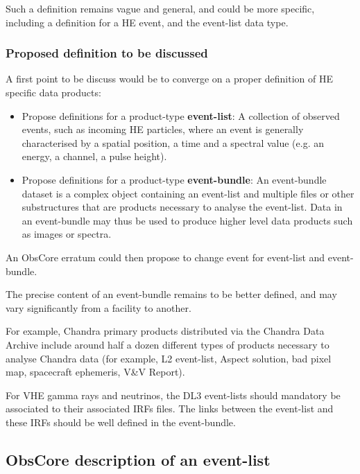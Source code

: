 \documentclass[11pt,a4paper]{ivoa}
\begin{document}
{Such a definition remains vague and general, and could be more specific, including a definition for a \gls{HE} event, and the
event-list data type.

\subsubsection{Proposed definition to be discussed}

A first point to be discuss would be to converge on a proper definition of \gls{HE} specific data products:
\begin{itemize}
    \item Propose definitions for a product-type \textbf{event-list}: A collection of observed events, such as incoming
    \gls{HE} particles, where an event is generally characterised by a spatial position, a time and a spectral value
    (e.g. an energy, a channel, a pulse height).
    \item Propose definitions for a product-type \textbf{event-bundle}: An event-bundle dataset is a complex object
    containing an event-list and multiple files or other substructures that are products necessary to analyse the
    event-list. Data in an event-bundle may thus be used to produce higher level data products such as images or spectra.
\end{itemize}

An ObsCore erratum could then propose to change event for event-list and event-bundle.

The precise content of an event-bundle remains to be better defined, and may vary significantly from a facility to another.

For example, Chandra primary products distributed via the Chandra Data Archive include around half a dozen different
types of products necessary to analyse Chandra data (for example, L2 event-list, Aspect solution,
bad pixel map, spacecraft ephemeris, V\&V Report).


For \gls{VHE} gamma rays and neutrinos, the DL3 event-lists should mandatory be associated to their associated \gls{IRF}s files. The
links between the event-list and these \gls{IRF}s should be well defined in the event-bundle.


\subsection{ObsCore description of an event-list}
\label{sec:obscore_he}

}
\end{document}
